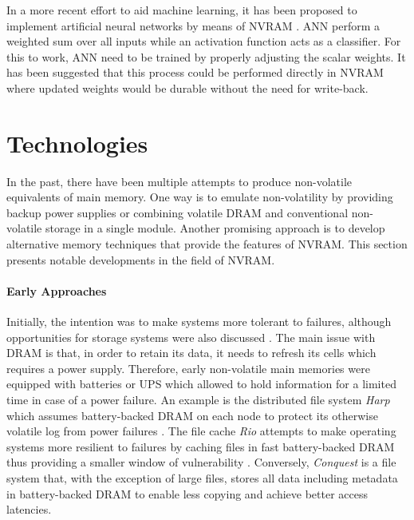 In a more recent effort to aid machine learning, it has been proposed to
implement artificial neural networks by means of NVRAM
\cite{fumarola2016accelerating}. ANN perform a weighted sum over all inputs
while an activation function acts as a classifier. For this to work, ANN need to
be trained by properly adjusting the scalar weights. It has been suggested that
this process could be performed directly in NVRAM where updated weights would be
durable without the need for write-back.

\section{Technologies}

In the past, there have been multiple attempts to produce non-volatile
equivalents of main memory. One way is to emulate non-volatility by providing
backup power supplies or combining volatile DRAM and conventional non-volatile
storage in a single module. Another promising approach is to develop alternative
memory techniques that provide the features of NVRAM. This section presents
notable developments in the field of NVRAM.

\paragraph{Early Approaches}

Initially, the intention was to make systems more tolerant to failures, although
opportunities for storage systems were also discussed \cite{molina1992main,
wang2002conquest}. The main issue with DRAM is that, in order to retain its
data, it needs to refresh its cells which requires a power supply. Therefore,
early non-volatile main memories were equipped with batteries or UPS which
allowed to hold information for a limited time in case of a power failure. An
example is the distributed file system \emph{Harp} which assumes battery-backed
DRAM on each node to protect its otherwise volatile log from power failures
\cite{liskov1991replication}. The file cache \emph{Rio} attempts to make
operating systems more resilient to failures by caching files in fast
battery-backed DRAM thus providing a smaller window of vulnerability
\cite{chen1996rio}. Conversely, \emph{Conquest} is a file system that, with the
exception of large files, stores all data including metadata in battery-backed
DRAM \cite{wang2002conquest} to enable less copying and achieve better access latencies.


